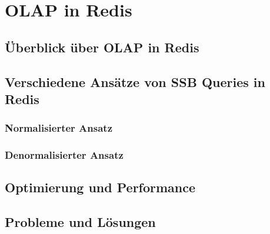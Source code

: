 \chapter{OLAP in Redis}
\section{Überblick über OLAP in Redis}
\section{Verschiedene Ansätze von \acf{SSB} Queries in Redis}
\subsection{Normalisierter Ansatz}
\subsection{Denormalisierter Ansatz}
\section{Optimierung und Performance}
\section{Probleme und Lösungen}